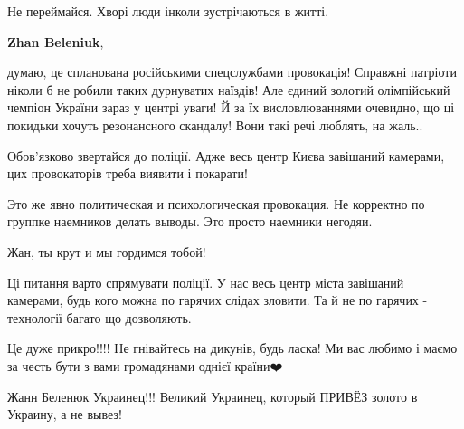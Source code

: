 \begin{itemize}
Не переймайся. Хворі люди інколи зустрічаються в житті.

 
\textbf{Zhan Beleniuk}, 

думаю, це спланована російськими спецслужбами провокація! Справжні патріоти
ніколи б не робили таких дурнуватих наїздів! Але єдиний золотий олімпійський
чемпіон України зараз у центрі уваги! Й за їх висловлюваннями очевидно, що ці
покидьки хочуть резонансного скандалу! Вони такі речі люблять, на жаль..

Обов'язково звертайся до поліції. Адже весь центр Києва завішаний камерами, цих
провокаторів треба виявити і покарати!

 
Это же явно политическая и психологическая провокация. Не корректно по группке
наемников делать выводы. Это просто наемники негодяи.

 
Жан, ты крут и мы гордимся тобой!


Ці питання варто спрямувати поліції. У нас весь центр міста завішаний камерами,
будь кого можна по гарячих слідах зловити. Та й не по гарячих - технології
багато що дозволяють.

 

Це дуже прикро!!!! Не гнівайтесь на дикунів, будь ласка! Ми вас любимо і маємо
за честь бути з вами громадянами однієї країни❤️


 
Жанн Беленюк Украинец!!! Великий Украинец, который ПРИВЁЗ золото в Украину, а не вывез!

\end{itemize}


